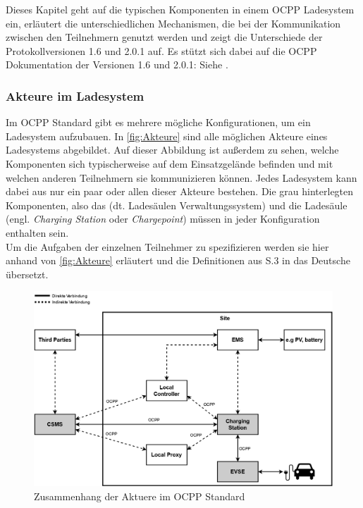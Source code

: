 \noindent Dieses Kapitel geht auf die typischen Komponenten in einem \acs{OCPP} Ladesystem ein, erläutert die unterschiedlichen Mechanismen, die bei der Kommunikation zwischen den Teilnehmern genutzt werden und zeigt die Unterschiede der Protokollversionen 1.6 und 2.0.1 auf. Es stützt sich dabei auf die OCPP Dokumentation der Versionen 1.6 und 2.0.1:
Siehe \cite{OCPP-2.0.1-part0-introduction, OCPP-2.0.1-part1-architecture-topology, OCPP-2.0.1-part4-ocpp-j-specification, OCPP-2.0.1-part2-specification-edition2, OCPP-j-1.6-specification, OCPP-1.6-edition-2}.
\subsubsection{Akteure im Ladesystem}
Im \acs{OCPP} Standard gibt es mehrere mögliche Konfigurationen, um ein Ladesystem aufzubauen. In \autoref{fig:Akteure} sind alle möglichen Akteure eines Ladesystems abgebildet. Auf dieser Abbildung ist außerdem zu sehen, welche Komponenten sich typischerweise auf dem Einsatzgelände befinden und mit welchen anderen Teilnehmern sie kommunizieren können. Jedes Ladesystem kann dabei aus nur ein paar oder allen dieser Akteure bestehen. Die grau hinterlegten Komponenten, also das  (dt. Ladesäulen Verwaltungssystem) und die Ladesäule (engl. \textit{Charging Station} oder \textit{Chargepoint}) müssen in jeder Konfiguration enthalten sein.\\

\noindent Um die Aufgaben der einzelnen Teilnehmer zu spezifizieren werden sie hier anhand von \autoref{fig:Akteure} erläutert und die Definitionen aus \cite{OCPP-2.0.1-part1-architecture-topology} S.3 in das Deutsche übersetzt.
 
\begin{figure}[H]
	\centering
	\includegraphics[width=1.0\textwidth]{images/OCPP/Ladesystem.drawio.png}
	\caption{Zusammenhang der Aktuere im \acs{OCPP} Standard \cite{Eigene_Darstellung, ocpp_ieee, OCPP-2.0.1-part1-architecture-topology}}
	\label{fig:Akteure}
\end{figure}

